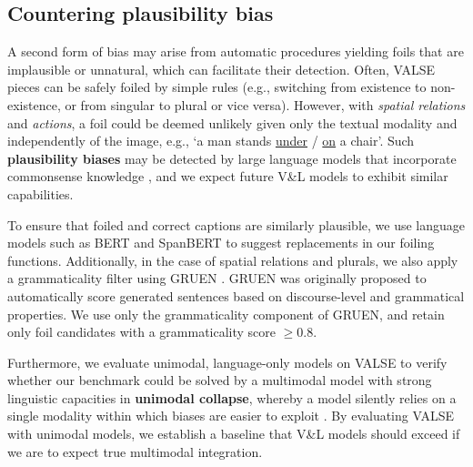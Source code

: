 \documentclass[11pt]{article}
\newcommand{\gr}[1]{\textcolor{niceblue}{#1}}
\newcommand\red[1]{\textcolor{niceorange}{#1}}
\newcommand{\dataset}{VALSE}
\begin{document}
\subsection{Countering plausibility bias}\label{subsec:why-unimodal}



A second form of bias may arise from automatic procedures yielding foils that are implausible or unnatural, which can facilitate their detection. 
Often, \dataset{} pieces can be safely foiled by simple rules
(e.g., switching from existence to non-existence, or from singular to plural or vice versa).
However, with \textit{spatial relations} and \textit{actions}, a foil could be deemed unlikely given only the textual modality and independently of the image, e.g., `a man stands \underline{\red{under}} / \underline{\gr{on}} a chair'.
Such \textbf{plausibility biases} may be detected by large language models that incorporate commonsense knowledge \cite{petroni-etal-2019-language, wang2020language}, and we expect future V\&L models to exhibit similar capabilities.

To ensure that foiled and correct captions are similarly plausible,
we use language models such as BERT \cite{devlin2019bert} and SpanBERT \cite{joshi-etal-2020-spanbert} to suggest
replacements in our foiling functions.
Additionally, in the case of spatial relations and plurals, we also apply a grammaticality filter using GRUEN \cite{zhu-bhat-2020-gruen}. GRUEN was originally proposed to automatically score generated sentences based on discourse-level and grammatical properties. We use only the grammaticality component of GRUEN, and retain only foil candidates with a grammaticality score $\geq 0.8$.

Furthermore, we evaluate unimodal, language-only models on \dataset{} to verify
whether our benchmark could be solved by a multimodal model with strong linguistic capacities in \textbf{unimodal collapse}, whereby a model silently relies on a single modality within which biases are easier to exploit \cite{goyal2017making, shekhar-etal-2019-evaluating}.
By evaluating \dataset{} with unimodal models, we establish a baseline that V\&L models should exceed if we are to expect true multimodal integration.
\end{document}
